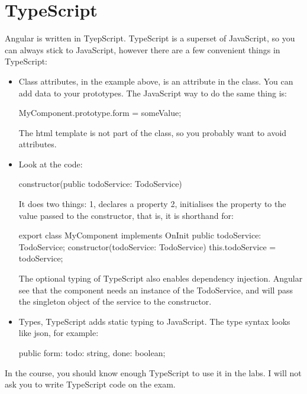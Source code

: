 \section{TypeScript}
Angular is written in TyepScript. TypeScript is a superset of JavaScript, so you can always stick to JavaScript, however there are a few convenient things in TypeScript:
\begin{itemize}
\item Class attributes, in the example above,  is an attribute in the  class. You can add data to your prototypes. The JavaScript way to do the same thing is: 
\begin{Code}
MyComponent.prototype.form = someValue;
\end{Code}
The html template is not part of the class, so you probably want to avoid  attributes.
\item Look at the code: 
\begin{Code}
constructor(public todoService: TodoService) { }
\end{Code}
It does two things: 1, declares a  property 2, initialises the property to the value passed to the constructor, that is, it is shorthand for:
\begin{Code}
export class MyComponent implements OnInit {
  public todoService: TodoService;
  constructor(todoService: TodoService) { 
    this.todoService = todoService;
  }
}
\end{Code}
The optional typing of TypeScript also enables dependency injection. Angular see that the component needs an instance of the TodoService, and will pass the singleton object of the service to the constructor.
\item Types, TypeScript adds static typing to JavaScript. The type syntax looks like json, for example:
\begin{Code}
public form: {todo: string, done: boolean};
\end{Code}
\end{itemize}
In the course, you should know enough TypeScript to use it in the labs. I will not ask you to write TypeScript code on the exam.

